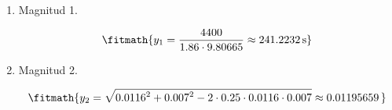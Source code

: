 \begin{enumerate}

\item Magnitud 1.

\[\fitmath{y_{1}=\frac{4400}{1.86\cdot 9.80665}\approx 241.2232\,\mathrm{s}}\]

\item Magnitud 2.

\[\fitmath{y_{2}=\sqrt{{0.0116}^{2}+{0.007}^{2}-2\cdot 0.25\cdot 0.0116\cdot 0.007}\approx 0.01195659\,}\]

\end{enumerate}
